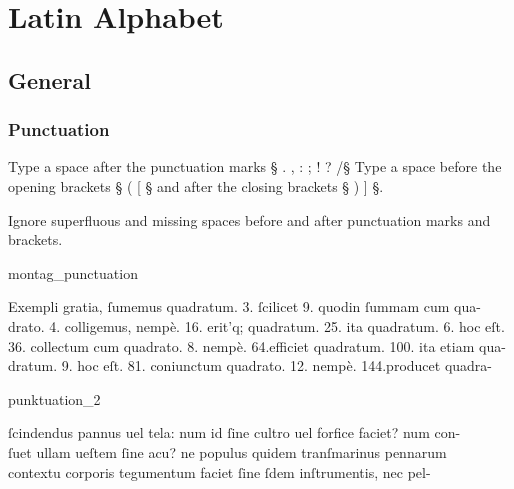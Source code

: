 \section{Latin Alphabet}

\tocspace
\subsection{General}
\label{section latin general}

\subsubsection{Punctuation}
\label{section latin punctuation}

\begin{mainrule}
Type a space after the punctuation marks § . , : ; ! ? /§ \quad
Type a space before the opening brackets § ( [ § and after the closing brackets  § ) ] §.
\end{mainrule}

\begin{clarification}
Ignore superfluous and missing spaces before and after punctuation marks and brackets.
\end{clarification}

\vspace{2mm}
\begin{sampleImage}{montag_punctuation}
\begin{typeLatin}
Exempli gratia, ſumemus quadratum. 3. ſcilicet 9. quod\lwr in ſummam cum qua- \\
drato. 4. colligemus, nempè. 16. erit\bs'q; quadratum. 25. \lwr ita quadratum. 6. hoc eſt. \\
36. collectum cum quadrato. 8. nempè. 64.\lwr efficiet quadratum. 100. ita etiam qua- \\
dratum. 9. hoc eſt. 81. coniunctum quadrato. 12. nempè. 144.\lwr producet quadra-  \\
\someText {}
\end{typeLatin}
\end{sampleImage}

\begin{sampleImage}{punktuation_2}
\begin{typeLatin}
 \someText
{}ſcindendus pannus uel tela: num id ſine cultro uel forfice faciet? num con- \\
ſuet ullam ueſtem ſine acu? ne populus quidem tranſmarinus pennarum \\
contextu corporis tegumentum faciet ſine ſdem inſtrumentis, nec pel- \\
\someText {}
\end{typeLatin}
\end{sampleImage}


